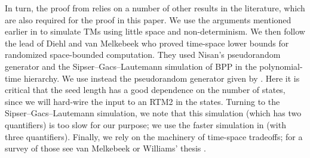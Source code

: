 In turn, the proof from \cite{ViolaBPvsE} relies on a number of other
results in the literature, which are also required for the proof in
this paper. We use the arguments mentioned earlier in \cite{MaS87,DBLP:journals/tcs/MelkebeekR05}
to simulate TMs using little space and non-determinism. We then follow
the lead of Diehl and van Melkebeek \cite{DvM06} who proved time-space
lower bounds for randomized space-bounded computation. They used Nisan's
pseudorandom generator \cite{Nis92} and the Sipser--Gacs--Lautemann
\cite{Sip83b,Lau83} simulation of BPP in the polynomial-time hierarchy.
We use instead the pseudorandom generator given by .
Here it is critical that the seed length has a good dependence on
the number of states, since we will hard-wire the input to an RTM2
in the states. Turning to the Sipser--Gacs--Lautemann simulation, we
note that this simulation (which has two quantifiers) is too slow
for our purpose; we use the faster simulation in \cite{ViolaBPvsE}
(with three quantifiers). Finally, we rely on the machinery of time-space
tradeoffs; for a survey of those see van Melkebeek \cite{Melkebeek06}
or Williams' thesis \cite{Williams07}.

